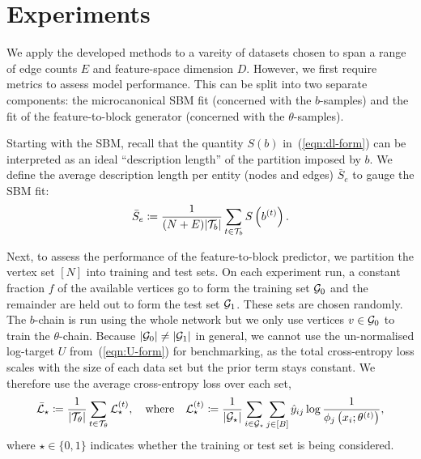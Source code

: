 \section{Experiments}
\label{sec:experiments}

We apply the developed methods to a vareity of datasets chosen to span a range of edge counts $E$ and feature-space dimension $D$. 
However, we first require metrics to assess model performance. This can be split into two separate 
components: the microcanonical SBM fit (concerned with the $b$-samples) and 
the fit of the feature-to-block generator (concerned with the $\theta$-samples). 

Starting with the SBM, recall that the quantity $S(b)$ in~(\ref{eqn:dl-form}) 
can be interpreted as an ideal ``description length'' of the partition 
imposed by $b$. We define the average
description length per entity (nodes and edges) $\bar{S}_e$ to gauge the SBM fit:
%
\begin{equation}
	\bar{S}_e \coloneqq \frac{1}{(N+E) |\mathcal{T}_b|} \sum_{t\in \mathcal{T}_b} S \left( b^{(t)} \right).
	\label{eqn:mean-dl}
\end{equation}

Next, to assess the performance of the feature-to-block predictor, 
we partition the vertex set $[N]$ into training and test sets. On each experiment run,
a constant fraction $f$ of the available vertices go to form 
the training set $\mathcal{G}_0$ and the remainder are held out to form the
test set $\mathcal{G}_1$. These sets are chosen randomly.
The $b$-chain is run using the whole network but we only use vertices $v \in \mathcal{G}_0$ to train the $\theta$-chain. Because $|\mathcal{G}_0| \neq |\mathcal{G}_1|$ in general, we cannot use the un-normalised log-target $U$ from~(\ref{eqn:U-form}) for benchmarking,
as the total cross-entropy loss scales with the size of each data set but 
the prior term stays constant. We therefore use the average cross-entropy loss 
over each set,
%
\begin{equation}
	\bar{\mathcal{L}}_\star \coloneqq \frac{1}{|\mathcal{T}_\theta|} \sum_{t \in \mathcal{T}_\theta} \mathcal{L}_\star^{(t)},
	\quad \textrm{where} \quad
	\mathcal{L}_\star^{(t)} \coloneqq \frac{1}{|\mathcal{G}_\star|} \sum_{i \in \mathcal{G}_\star}\sum_{j \in [B]} \hat{y}_{ij} \log \frac{1}{\phi_j \left(x_i; \theta^{(t)} \right)},
	\label{eqn:cross-entropy-loss}
\end{equation}
%
where $\star \in \{0, 1\}$ indicates whether the training or test
set is being considered.

